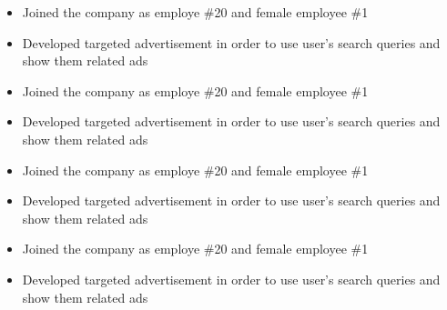 \documentclass[8pt,a4paper]{altacv}
\begin{document}
\begin{itemize}
\item Joined the company as employe \#20 and female employee \#1
\item Developed targeted advertisement in order to use user's search queries and show them related ads
\end{itemize}

\begin{itemize}
\item Joined the company as employe \#20 and female employee \#1
\item Developed targeted advertisement in order to use user's search queries and show them related ads
\end{itemize}

\begin{itemize}
\item Joined the company as employe \#20 and female employee \#1
\item Developed targeted advertisement in order to use user's search queries and show them related ads
\end{itemize}

\begin{itemize}
\item Joined the company as employe \#20 and female employee \#1
\item Developed targeted advertisement in order to use user's search queries and show them related ads
\end{itemize}


\clearpage


\nocite{*}

\printbibliography[heading=pubtype,title={\printinfo{\faBook}{Books}},type=book]

\divider

\printbibliography[heading=pubtype,title={\printinfo{\faFileTextO}{Journal Articles}}, type=article]

\divider

\printbibliography[heading=pubtype,title={\printinfo{\faGroup}{Conference Proceedings}},type=inproceedings]

\end{document}
